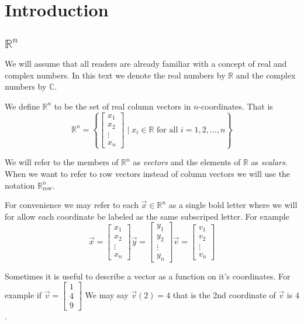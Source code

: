 \section{Introduction}
\subsection{$\mathbb{R}^n$}
We will assume that all readers are already familiar with a concept of real and complex numbers. In this text we denote the real numbers by $\mathbb{R}$ and the complex numbers by $\mathbb{C}$. 

\begin{definition}
We define $\mathbb{R}^n$ to be the set of real column vectors in $n$-coordinates. That is 
\[
\mathbb{R}^n=\left\{ \begin{bmatrix}
x_1\\ x_2 \\ \vdots \\ x_n
\end{bmatrix}
\mid
x_i \in \mathbb{R}\text{ for all }i=1,2, \ldots, n
\right\}
\]

We will refer to the members of $\mathbb{R}^n$ as \emph{vectors} and the 
elements of $\mathbb{R}$ as \emph{scalars}. When we want to refer to row vectors 
instead of column vectors we will use the notation $\mathbb{R}^n_\text{row}$.
\end{definition}

For convenience we may refer to each $\vec{x} \in \mathbb{R}^n$ as a single 
bold letter where we will for allow each coordinate be labeled as the same 
subscriped letter. For example
\[
\vec{x}=\begin{bmatrix}x_1\\ x_2 \\ \vdots \\ x_n\end{bmatrix}
\vec{y}=\begin{bmatrix}y_1\\ y_2 \\ \vdots \\ y_n\end{bmatrix}
\vec{v}=\begin{bmatrix}v_1\\ v_2 \\ \vdots \\ v_n\end{bmatrix}
\]

\begin{remark}
Sometimes it is useful to describe a vector as a function on it's coordinates. 
For example if 
$\vec{v}=\begin{bmatrix}1 \\ 4 \\ 9 \end{bmatrix}$ We may say 
$\vec{v}(2)=4$ that is the 2nd coordinate of $\vec{v}$ is $4$.
\end{remark}


